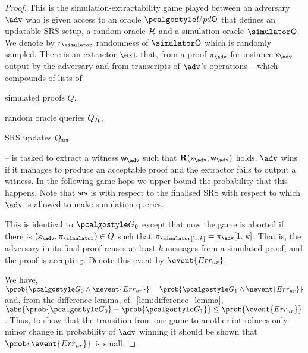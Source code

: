 \begin{proof}		

   This is the simulation-extractability game played between an adversary
  $\advse$ who is given access to an oracle $\initU$ that defines an updatable SRS
  setup, a random oracle $\mathcal{H}$ and a simulation oracle $\simO$. We denote by $\rsim$
  randomness of $\simO$ which is randomly sampled. There is an extractor $\ext$ that,
  from a proof $\zkproof_{\advse}$ for instance $\inp_{\advse}$ output by the
  adversary and from transcripts of $\advse$'s operations -- which compounds of lists
  of
  \begin{inparaenum}[(1)]
  \item simulated proofs $Q$,
  \item random oracle queries $Q_{\mathcal{H}}$,
  \item SRS updates $Q_{\mathsf{srs}}$.
  \end{inparaenum}
  -- is tasked to extract a witness $\wit_{\advse}$ such that
  $\REL(\inp_{\advse}, \wit_{\advse})$ holds. $\advse$ wins if it manages to produce
  an acceptable proof and the extractor fails to output a witness. In the following
  game hops we upper-bound the probability that this happens. Note that $\mathsf{srs}$ is
  with respect to the finalised SRS with respect to which $\adv$ is allowed to make
  simulation queries.

   This is identical to $\game{0}$ except that now the game is aborted if
  there is $(\inp_\advse, \zkproof_{\simulator}) \in Q$ such that
  $\zkproof_\simulator[1..k] = \zkproof_{\advse}[1..k]$. That is, the adversary in
  its final proof reuses at least $k$ messages from a simulated proof, and the proof
  is accepting.  Denote this event by $\event{\errur}$.

  We have,
  \( \prob{\game{0} \land \nevent{\errur}} = \prob{\game{1} \land \nevent{\errur}} \)
  and, from the difference lemma, cf.~\cref{lem:difference_lemma},
  $ \abs{\prob{\game{0}} - \prob{\game{1}}} \leq \prob{\event{\errur}}\,$.  Thus, to
  show that the transition from one game to another introduces only minor change in
  probability of $\adv$ winning it should be shown that $\prob{\event{\errur}}$ is
  small.
  

\end{proof}

